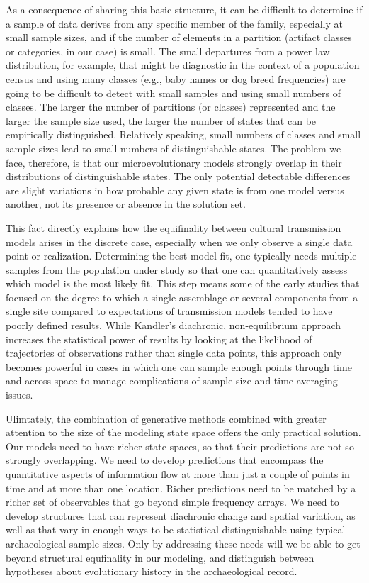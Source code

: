 As a consequence of sharing this basic structure, it can be difficult to determine if a sample of data derives from any specific member of the family, especially at small sample sizes, and if the number of elements in a partition (artifact classes or categories, in our case) is small.  The small departures from a power law distribution, for example, that might be diagnostic in the context of a population census and using many classes (e.g., baby names or dog breed frequencies) are going to be difficult to detect with small samples and using small numbers of classes. The larger the number of partitions (or classes) represented and the larger the sample size used, the larger the number of states that can be empirically distinguished. Relatively speaking, small numbers of classes and small sample sizes lead to small numbers of distinguishable states. The problem we face, therefore, is that our microevolutionary models strongly overlap in their distributions of distinguishable states. The only potential detectable differences are slight variations in how probable any given state is from one model versus another, not its presence or absence in the solution set. 

This fact directly explains how the equifinality between cultural transmission models arises in the discrete case, especially when we only observe a single data point or realization.  Determining the best model fit, one typically needs multiple samples from the population under study so that one can quantitatively assess which model is the most likely fit. This step means some of the early studies that focused on the degree to which a single assemblage or several components from a single site compared to expectations of transmission models tended to have poorly defined results. While Kandler's \citeyearpar{Kandler2013} diachronic, non-equilibrium approach increases the statistical power of results by looking at the likelihood of trajectories of observations rather than single data points, this approach only becomes powerful in cases in which one can sample enough points through time and across space to manage complications of sample size and time averaging issues. 

Ulimtately, the combination of generative methods combined with greater attention to the size of the modeling state space  offers the only practical solution. Our models need to have richer state spaces, so that their predictions are not so strongly overlapping.  We need to develop predictions that encompass the quantitative aspects of information flow at more than just a couple of points in time and at more than one location. Richer predictions need to be matched by a richer set of observables that go beyond simple frequency arrays.  We need to develop structures that can represent diachronic change and spatial variation, as well as that vary in enough ways to be statistical distinguishable using typical archaeological sample sizes. Only by addressing these needs will we be able to get beyond structural equfinality in our modeling, and distinguish between hypotheses about evolutionary history in the archaeological record.

